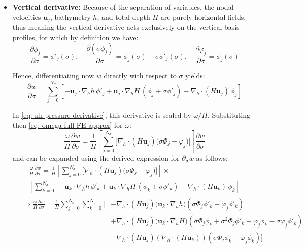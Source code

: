 \documentclass{article}
\newcommand{\Ns}{N_\sigma}
\newcommand{\uj}{\mathbf{u}_j}
\newcommand{\uk}{\mathbf{u}_k}
\newcommand{\sumj}{\sum_{j=0}^{\Ns}}
\newcommand{\sumk}{\sum_{k=0}^{\Ns}}
\newcommand{\nablah}{\nabla_h}
\newcommand{\dds}[1]{\frac{\partial #1}{\partial \sigma}}
\newcommand{\vphij}{\varphi_j}
\begin{document}
\begin{itemize}
    
    \item \textbf{Vertical derivative:}
    Because of the separation of variables, the nodal velocities $\uj$, bathymetry $h$, and total depth $H$ are purely horizontal fields, thus meaning the vertical derivative acts exclusively on the vertical basis profiles, for which by definition we have:
    $$\frac{\partial \phi_j}{\partial \sigma} = \phi'_j(\sigma), \quad \frac{\partial (\sigma \phi_j)}{\partial \sigma} = \phi_j(\sigma) + \sigma \phi'_j(\sigma), \quad \dds{\vphij} = \phi_j(\sigma)$$
    
    Hence, differentiating now $w$ directly with respect to $\sigma$ yields:
    $$\dds{w} = \sumj \left[ -\uj \cdot \nablah h \,\phi'_j + \uj \cdot \nablah H \,(\phi_j + \sigma \phi'_j) - \nablah \cdot (H \uj)\,\phi_j \right]$$
    
    In \eqref{eq: nh pressure derivative}, this derivative is scaled by $\omega/H$. 
    Substituting then \eqref{eq: omega full FE approx} for $\omega$:
    \begin{equation*}
        \frac{\omega}{H}\dds{w} = \frac{1}{H}\left[ \sumj \bigg[ \nablah \cdot \left( H \uj\right) \Big( \sigma \Phi_j - \vphij\Big) \bigg] \right] \dds{w} 
    \end{equation*}
    and can be expanded using the derived expression for $\partial_\sigma w$ as follows:
    \begin{multline*}
        \frac{\omega}{H}\dds{w} = 
        \frac{1}{H}\left[ \sumj \bigg[ \nablah \cdot \left( H \uj\right) \Big( \sigma \Phi_j - \vphij\Big) \bigg] \right] \times \\
        \left[\sumk -\uk \cdot \nablah h \,\phi'_k 
        + \uk \cdot \nablah H \,(\phi_k + \sigma \phi'_k) - \nablah \cdot (H \uk)\,\phi_k \right] 
    \end{multline*}
    \begin{multline}
    \begin{aligned}
        \implies  \frac{\omega}{H}\dds{w} = \frac{1}{H} \sumj \sumk \Bigg[ 
        &-\nablah \cdot (H \uj) \Big(\uk \cdot \nablah h\Big) \left( \sigma \Phi_j \phi'_k - \vphij \phi'_k \right) \\ 
        &+ \nablah \cdot (H \uj) \Big(\uk \cdot \nablah H\Big) \left( \sigma \Phi_j \phi_k + \sigma^2 \Phi_j \phi'_k - \vphij \phi_k - \sigma \vphij \phi'_k \right) \\ 
        &- \nablah \cdot (H \uj) \left(\nablah \cdot (H \uk)\right) \left( \sigma \Phi_j \phi_k - \vphij \phi_k \right) 
        \Bigg]
        \end{aligned}
        \label{eq: w vertical derivative expansion}
    \end{multline}
    

\end{itemize}
\end{document}
